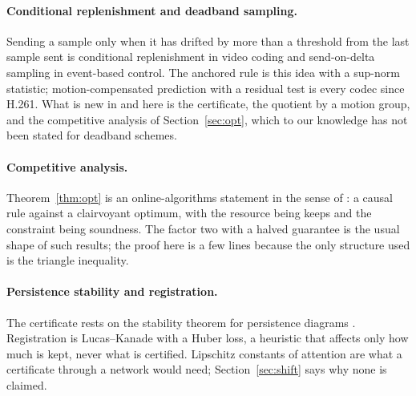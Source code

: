 \paragraph{Conditional replenishment and deadband sampling.} Sending a sample only when it has drifted by more than a threshold from the last sample sent is conditional replenishment \citep{mounts1969} in video coding and send-on-delta sampling \citep{miskowicz2006} in event-based control. The anchored rule is this idea with a sup-norm statistic; motion-compensated prediction with a residual test is every codec since H.261. What is new in \citet{nair2026certifiedskip} and here is the certificate, the quotient by a motion group, and the competitive analysis of Section~\ref{sec:opt}, which to our knowledge has not been stated for deadband schemes.

\paragraph{Competitive analysis.} Theorem~\ref{thm:opt} is an online-algorithms statement in the sense of \citet{borodin1998}: a causal rule against a clairvoyant optimum, with the resource being keeps and the constraint being soundness. The factor two with a halved guarantee is the usual shape of such results; the proof here is a few lines because the only structure used is the triangle inequality.

\paragraph{Persistence stability and registration.} The certificate rests on the stability theorem for persistence diagrams \citep{cohensteiner2007}. Registration is Lucas--Kanade \citep{lucas1981,baker2004lk} with a Huber loss, a heuristic that affects only how much is kept, never what is certified. Lipschitz constants of attention \citep{kim2021lipschitz} are what a certificate through a network would need; Section~\ref{sec:shift} says why none is claimed.
